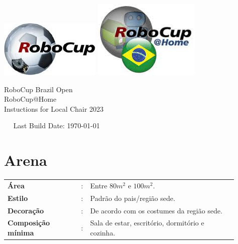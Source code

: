 \documentclass[11pt, twoside, openright, a4paper, chapterprefix]{article}
\begin{document}
\begin{titlepage}
    \begin{center}
      {
        \includegraphics[width=.25\textwidth]{images/logo_RoboCupFed.jpg}
        \hfill
        \includegraphics[width=.23\textwidth]{images/logo_rcbrazilhome.png}\\
        [1.23ex]
      }
      \vspace{2.7 cm}
      \hrulefill\par
      {%
        \vspace*{.27cm}
        \Huge{RoboCup Brazil Open}\\[1.23ex]
        \Huge{RoboCup@Home}\\[1.23ex]
        \Large Instuctions for Local Chair 2023\\[2ex]
      }
      \hrulefill\par
      \vfill
      ~~ Last Build Date: \today \quad 
      \vfill
    \end{center}
  \end{titlepage}


% 
% 
% 

\clearpage




\section{Arena}

\begin{tabular}{ p{0.3\linewidth} p{0.01\linewidth} p{0.6\linewidth}}
    \textbf{Área}                               & : & Entre $80m^2$ e $100m^2$. \\
    \textbf{Estilo}                          & : & Padrão do pais/região sede. \\
    \textbf{Decoração}                   & : & De acordo com os costumes da região sede. \\
    \textbf{Composição mínima}  & : & Sala de estar, escritório, dormitório e cozinha.
\end{tabular}
\end{document}
